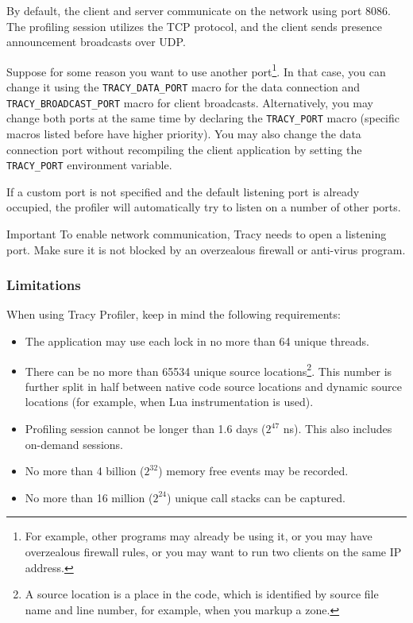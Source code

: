 \documentclass[hidelinks,titlepage,a4paper]{article}
\begin{document}
By default, the client and server communicate on the network using port 8086. The profiling session utilizes the TCP protocol, and the client sends presence announcement broadcasts over UDP.

Suppose for some reason you want to use another port\footnote{For example, other programs may already be using it, or you may have overzealous firewall rules, or you may want to run two clients on the same IP address.}. In that case, you can change it using the \texttt{TRACY\_DATA\_PORT} macro for the data connection and \texttt{TRACY\_BROADCAST\_PORT} macro for client broadcasts. Alternatively, you may change both ports at the same time by declaring the \texttt{TRACY\_PORT} macro (specific macros listed before have higher priority). You may also change the data connection port without recompiling the client application by setting the \texttt{TRACY\_PORT} environment variable.

If a custom port is not specified and the default listening port is already occupied, the profiler will automatically try to listen on a number of other ports.

\begin{bclogo}[
noborder=true,
couleur=black!5,
logo=\bcbombe
]{Important}
To enable network communication, Tracy needs to open a listening port. Make sure it is not blocked by an overzealous firewall or anti-virus program.
\end{bclogo}

\subsubsection{Limitations}

When using Tracy Profiler, keep in mind the following requirements:

\begin{itemize}
\item The application may use each lock in no more than 64 unique threads.
\item There can be no more than 65534 unique source locations\footnote{A source location is a place in the code, which is identified by source file name and line number, for example, when you markup a zone.}. This number is further split in half between native code source locations and dynamic source locations (for example, when Lua instrumentation is used).
\item Profiling session cannot be longer than 1.6 days ($2^{47}$ \si{\nano\second}). This also includes on-demand sessions.
\item No more than 4 billion ($2^{32}$) memory free events may be recorded.
\item No more than 16 million ($2^{24}$) unique call stacks can be captured.
\end{itemize}
\end{document}
